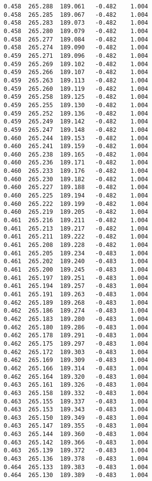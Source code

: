 \begin{verbatim}
   0.458  265.288  189.061   -0.482    1.004
   0.458  265.285  189.067   -0.482    1.004
   0.458  265.283  189.073   -0.482    1.004
   0.458  265.280  189.079   -0.482    1.004
   0.458  265.277  189.084   -0.482    1.004
   0.458  265.274  189.090   -0.482    1.004
   0.459  265.271  189.096   -0.482    1.004
   0.459  265.269  189.102   -0.482    1.004
   0.459  265.266  189.107   -0.482    1.004
   0.459  265.263  189.113   -0.482    1.004
   0.459  265.260  189.119   -0.482    1.004
   0.459  265.258  189.125   -0.482    1.004
   0.459  265.255  189.130   -0.482    1.004
   0.459  265.252  189.136   -0.482    1.004
   0.459  265.249  189.142   -0.482    1.004
   0.459  265.247  189.148   -0.482    1.004
   0.460  265.244  189.153   -0.482    1.004
   0.460  265.241  189.159   -0.482    1.004
   0.460  265.238  189.165   -0.482    1.004
   0.460  265.236  189.171   -0.482    1.004
   0.460  265.233  189.176   -0.482    1.004
   0.460  265.230  189.182   -0.482    1.004
   0.460  265.227  189.188   -0.482    1.004
   0.460  265.225  189.194   -0.482    1.004
   0.460  265.222  189.199   -0.482    1.004
   0.460  265.219  189.205   -0.482    1.004
   0.461  265.216  189.211   -0.482    1.004
   0.461  265.213  189.217   -0.482    1.004
   0.461  265.211  189.222   -0.482    1.004
   0.461  265.208  189.228   -0.482    1.004
   0.461  265.205  189.234   -0.483    1.004
   0.461  265.202  189.240   -0.483    1.004
   0.461  265.200  189.245   -0.483    1.004
   0.461  265.197  189.251   -0.483    1.004
   0.461  265.194  189.257   -0.483    1.004
   0.461  265.191  189.263   -0.483    1.004
   0.462  265.189  189.268   -0.483    1.004
   0.462  265.186  189.274   -0.483    1.004
   0.462  265.183  189.280   -0.483    1.004
   0.462  265.180  189.286   -0.483    1.004
   0.462  265.178  189.291   -0.483    1.004
   0.462  265.175  189.297   -0.483    1.004
   0.462  265.172  189.303   -0.483    1.004
   0.462  265.169  189.309   -0.483    1.004
   0.462  265.166  189.314   -0.483    1.004
   0.462  265.164  189.320   -0.483    1.004
   0.463  265.161  189.326   -0.483    1.004
   0.463  265.158  189.332   -0.483    1.004
   0.463  265.155  189.337   -0.483    1.004
   0.463  265.153  189.343   -0.483    1.004
   0.463  265.150  189.349   -0.483    1.004
   0.463  265.147  189.355   -0.483    1.004
   0.463  265.144  189.360   -0.483    1.004
   0.463  265.142  189.366   -0.483    1.004
   0.463  265.139  189.372   -0.483    1.004
   0.463  265.136  189.378   -0.483    1.004
   0.464  265.133  189.383   -0.483    1.004
   0.464  265.130  189.389   -0.483    1.004

\end{verbatim}
